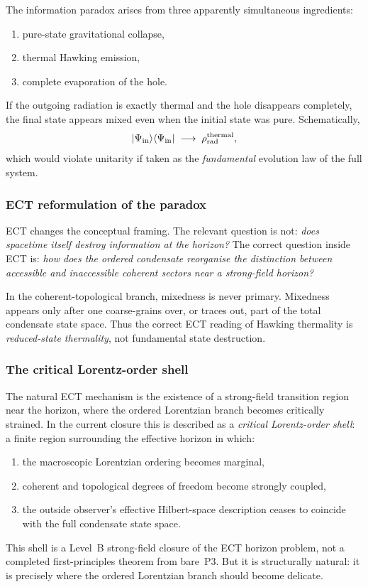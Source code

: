 The information paradox arises from three apparently simultaneous
ingredients:
\begin{enumerate}[label=(\roman*)]
  \item pure-state gravitational collapse,
  \item thermal Hawking emission,
  \item complete evaporation of the hole.
\end{enumerate}
If the outgoing radiation is exactly thermal and the hole disappears
completely, the final state appears mixed even when the initial state
was pure.
Schematically,
\begin{equation}
  \label{eq:qs_info_loss_naive}
  |\Psi_{\rm in}\rangle\langle\Psi_{\rm in}|
  \;\longrightarrow\;
  \rho_{\rm rad}^{\rm thermal},
\end{equation}
which would violate unitarity if taken as the \emph{fundamental}
evolution law of the full system.

\subsubsection*{ECT reformulation of the paradox}

ECT changes the conceptual framing.
The relevant question is not: \emph{does spacetime itself destroy
information at the horizon?}
The correct question inside ECT is: \emph{how does the ordered
condensate reorganise the distinction between accessible and
inaccessible coherent sectors near a strong-field horizon?}

In the coherent-topological branch, mixedness is never primary.
Mixedness appears only after one coarse-grains over, or traces out,
part of the total condensate state space.
Thus the correct ECT reading of Hawking thermality is
\emph{reduced-state thermality}, not fundamental state destruction.

\subsubsection*{The critical Lorentz-order shell}

The natural ECT mechanism is the existence of a strong-field transition
region near the horizon, where the ordered Lorentzian branch becomes
critically strained.
In the current closure this is described as a
\emph{critical Lorentz-order shell}: a finite region surrounding the
effective horizon in which:
\begin{enumerate}[label=(\roman*)]
  \item the macroscopic Lorentzian ordering becomes marginal,
  \item coherent and topological degrees of freedom become strongly
    coupled,
  \item the outside observer's effective Hilbert-space description
    ceases to coincide with the full condensate state space.
\end{enumerate}
This shell is a Level~B strong-field closure of the ECT horizon problem,
not a completed first-principles theorem from bare~P3.
But it is structurally natural: it is precisely where the ordered
Lorentzian branch should become delicate.

